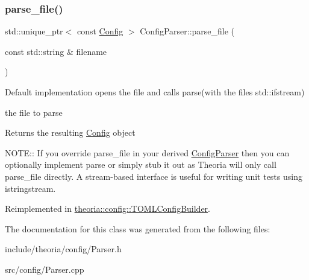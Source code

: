 \subsubsection{\texorpdfstring{parse\+\_\+file()}{parse\_file()}}
{\footnotesize\ttfamily std\+::unique\+\_\+ptr$<$ const \hyperlink{classtheoria_1_1config_1_1Config}{Config} $>$ Config\+Parser\+::parse\+\_\+file (\begin{DoxyParamCaption}\item[{const std\+::string \&}]{filename }\end{DoxyParamCaption})\hspace{0.3cm}{\ttfamily [virtual]}}

Default implementation opens the file and calls parse(with the file\textquotesingle{}s std\+::ifstream)

the file to parse \begin{DoxyReturn}{Returns}
the resulting \hyperlink{classtheoria_1_1config_1_1Config}{Config} object
\end{DoxyReturn}
N\+O\+TE\+:\+: If you override parse\+\_\+file in your derived \hyperlink{classtheoria_1_1config_1_1ConfigParser}{Config\+Parser} then you can optionally implement parse or simply stub it out as Theoria will only call parse\+\_\+file directly. A stream-\/based interface is useful for writing unit tests using istringstream. 

Reimplemented in \hyperlink{classtheoria_1_1config_1_1TOMLConfigBuilder_afba5445b56e12b39cf1b266627a27f58}{theoria\+::config\+::\+T\+O\+M\+L\+Config\+Builder}.



The documentation for this class was generated from the following files\+:\begin{DoxyCompactItemize}
\item 
include/theoria/config/Parser.\+h\item 
src/config/Parser.\+cpp\end{DoxyCompactItemize}
